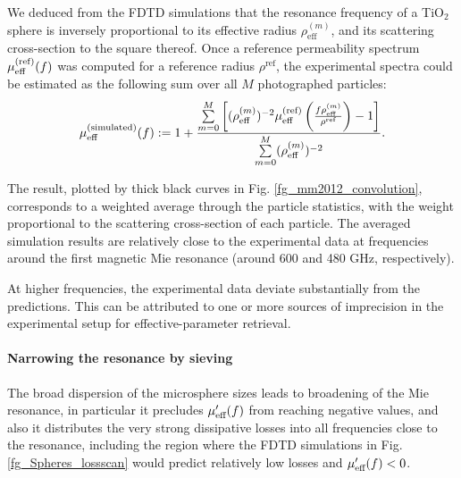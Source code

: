 We deduced from the FDTD simulations that the resonance frequency of a TiO$_{2}$ sphere is inversely proportional to its effective radius $\rho_{\text{eff}}^{(m)}$, and its scattering cross-section to the square thereof. Once a reference permeability spectrum $\mu_{\text{eff} }^{\text{(ref)}}(f)$ was computed for a reference radius $\rho^{\text{ref}}$, the experimental spectra could be estimated as the following sum over all $M$ photographed particles:
\begin{equation} \mu_{\text{eff} }^{\text{(simulated)}}(f) := 1 + \frac{\sum\limits_{m=0}^{M} \left[(\rho_{\text{eff}}^{(m)})^{-2} \mu_{\text{eff} }^{\text{(ref)}}\left(\frac{f \rho_{\text{eff}}^{(m)}}{\rho^{\text{ref}} }\right) - 1 \right]}{\sum\limits_{m=0}^{M} (\rho_{\text{eff}}^{(m)})^{-2}}. \label{eq_sumconvol}\end{equation}

	The result, plotted by thick black curves in Fig. \ref{fg_mm2012_convolution}, corresponds to a weighted average through the particle statistics, with the weight proportional to the scattering cross-section of each particle. The averaged simulation results are relatively close to the experimental data at frequencies around the first magnetic Mie resonance (around 600 and 480 GHz, respectively). 
	
	At higher frequencies, the experimental data deviate substantially from the predictions. This can be attributed to one or more sources of imprecision in the experimental setup for effective-parameter retrieval.



\paragraph{Narrowing the resonance by sieving} %
The broad dispersion of the microsphere sizes leads to broadening of the Mie resonance, in particular it precludes $\mu_{\text{eff} }'(f)$ from reaching negative values, and also it distributes the very strong dissipative losses into all frequencies close to the resonance, including the region where the FDTD simulations in Fig. \ref{fg_Spheres_lossscan} would predict relatively low losses and $\mu_{\text{eff} }'(f) < 0$.

